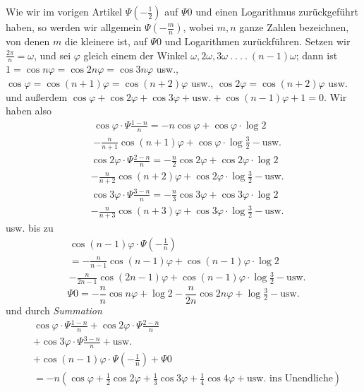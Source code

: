 Wie wir im vorigen Artikel $\Psi\left(-\tfrac12\right)$ auf $\Psi0$ und einen Logarithmus zurückgeführt haben, so werden wir allgemein $\Psi\left(-\frac mn\right)$, wobei $m,n$ ganze Zahlen bezeichnen, von denen $m$ die kleinere ist, auf $\Psi0$ und Logarithmen zurückführen. Setzen wir $\frac{2\pi}{n}=\omega$, und sei $\varphi$ gleich einem der Winkel $\omega,2\omega,3\omega\ .\ .\ .\ .\ (n-1)\omega$; dann ist $1=\cos n\varphi=\cos2n\varphi=\cos3n\varphi$ usw., $\cos\varphi=\cos(n+1)\varphi=\cos(n+2)\varphi$ usw., $\cos2\varphi=\cos(n+2)\varphi$ usw. und außerdem $\cos\varphi+\cos2\varphi+\cos3\varphi+\text{usw.}+\cos(n-1)\varphi+1=0$. Wir haben also
\[
\begin{aligned}
&\cos\varphi\cdot\Psi\frac{1-n}{n}=-n\cos\varphi+\cos\varphi\cdot\log2\\[4pt]
&-\frac{n}{n+1}\cos(n+1)\varphi+\cos\varphi\cdot\log\tfrac32-\text{usw.}
\end{aligned}
\]
\[
\begin{aligned}
&\cos2\varphi\cdot\Psi\frac{2-n}{n}=-\frac n2\cos2\varphi+\cos2\varphi\cdot\log2\\[4pt]
&-\frac{n}{n+2}\cos(n+2)\varphi+\cos2\varphi\cdot\log\tfrac32-\text{usw.}
\end{aligned}
\]
\[
\begin{aligned}
&\cos3\varphi\cdot\Psi\frac{3-n}{n}=-\frac n3\cos3\varphi+\cos3\varphi\cdot\log2\\[4pt]
&-\frac{n}{n+3}\cos(n+3)\varphi+\cos3\varphi\cdot\log\tfrac32-\text{usw.}
\end{aligned}
\]
usw. bis zu
\[
\begin{aligned}
&\cos(n-1)\varphi\cdot\Psi\left(-\frac1n\right)
\\[4pt]
&=-\frac{n}{n-1}\cos(n-1)\varphi+\cos(n-1)\varphi\cdot\log2\\[4pt]
&-\frac{n}{2n-1}\cos(2n-1)\varphi
+\cos(n-1)\varphi\cdot\log\tfrac32-\text{usw.}
\end{aligned}
\]
\[
\Psi0=-\frac nn\cos n\varphi+\log2-\frac{n}{2n}\cos2n\varphi+\log\tfrac32-\text{usw.}
\]
und durch \textit{Summation}
\[
\begin{aligned}
&\cos\varphi\cdot\Psi\frac{1-n}{n}+\cos2\varphi\cdot\Psi\frac{2-n}{n}\\[4pt]
&+\cos3\varphi\cdot\Psi\frac{3-n}{n}+\text{usw.}\\[4pt]
&+\cos(n-1)\varphi\cdot\Psi\left(-\frac1n\right)+\Psi0
\\[4pt]
&=-n(\cos\varphi+\tfrac12\cos2\varphi+\tfrac13\cos3\varphi+\tfrac14\cos4\varphi+\text{usw. ins Unendliche})
\end{aligned}
\]
